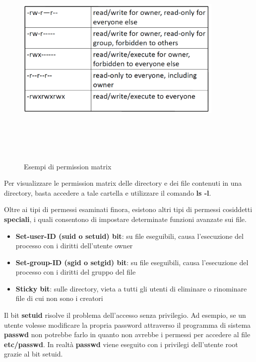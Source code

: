\begin{figure}[htbp]
	\centering%
	\subfigure%
	{\includegraphics[height=10cm, width=10cm, keepaspectratio]{Immagini/sistemi_operativi/perm_linux.png}}
	\caption{Esempi di permission matrix \label{fig:perm_linux}} 	
\end{figure}

Per visualizzare le permission matrix delle directory e dei file contenuti in una directory, basta accedere a tale cartella e utilizzare il comando \textbf{ls -l}. \newline \newline

Oltre ai tipi di permessi esaminati finora, esistono altri tipi di permessi cosiddetti \textbf{speciali}, i quali consentono di impostare determinate funzioni avanzate sui file.

\begin{itemize}
  \item \textbf{Set-user-ID (suid o setuid) bit}: su file eseguibili, causa l'esecuzione del processo con i diritti dell'utente owner
  \item \textbf{Set-group-ID (sgid o setgid) bit}: su file eseguibili, causa l'esecuzione del processo con i diritti del gruppo del file
  \item \textbf{Sticky bit}: sulle directory, vieta a tutti gli utenti di eliminare o rinominare file di cui non sono i creatori
\end{itemize}

Il bit \textbf{setuid} risolve il problema dell'accesso senza privilegio. Ad esempio, se un utente volesse modificare la propria password attraverso il programma di sistema \textbf{passwd} non potrebbe farlo in quanto non avrebbe i permessi per accedere al file \textbf{etc/passwd}. In realtà \textbf{passwd} viene eseguito con i privilegi dell'utente root grazie al bit setuid.


